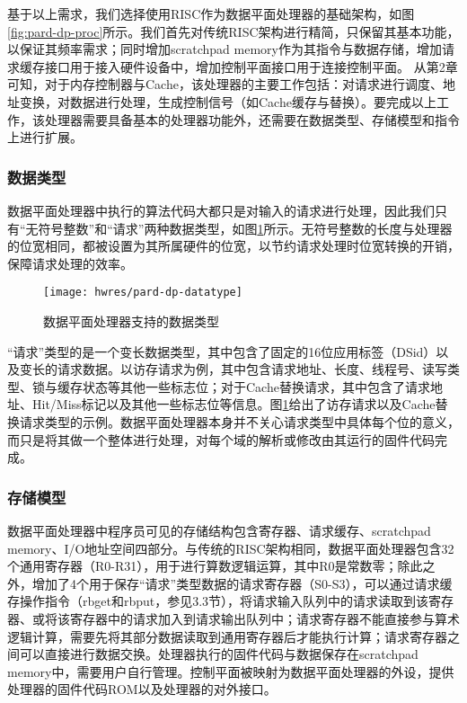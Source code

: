 基于以上需求，我们选择使用RISC作为数据平面处理器的基础架构，如图\ref{fig:pard-dp-proc}所示。我们首先对传统RISC架构进行精简，只保留其基本功能，以保证其频率需求；同时增加scratchpad memory作为其指令与数据存储，增加请求缓存接口用于接入硬件设备中，增加控制平面接口用于连接控制平面。
从第2章可知，对于内存控制器与Cache，该处理器的主要工作包括：对请求进行调度、地址变换，对数据进行处理，生成控制信号（如Cache缓存与替换）。要完成以上工作，该处理器需要具备基本的处理器功能外，还需要在数据类型、存储模型和指令上进行扩展。


\subsubsection{数据类型}

数据平面处理器中执行的算法代码大都只是对输入的请求进行处理，因此我们只有``无符号整数''和``请求''两种数据类型，如图\ref{fig:pard-dp-datatype}所示。无符号整数的长度与处理器的位宽相同，都被设置为其所属硬件的位宽，以节约请求处理时位宽转换的开销，保障请求处理的效率。

\begin{figure}[H]
  \centering
  \texttt{[image: hwres/pard-dp-datatype]}
  \caption{数据平面处理器支持的数据类型}
  \label{fig:pard-dp-datatype}
\end{figure}
 
``请求''类型的是一个变长数据类型，其中包含了固定的16位应用标签（DSid）以及变长的请求数据。以访存请求为例，其中包含请求地址、长度、线程号、读写类型、锁与缓存状态等其他一些标志位；对于Cache替换请求，其中包含了请求地址、Hit/Miss标记以及其他一些标志位等信息。图\ref{fig:pard-dp-datatype}给出了访存请求以及Cache替换请求类型的示例。数据平面处理器本身并不关心请求类型中具体每个位的意义，而只是将其做一个整体进行处理，对每个域的解析或修改由其运行的固件代码完成。

\subsubsection{存储模型}
数据平面处理器中程序员可见的存储结构包含寄存器、请求缓存、scratchpad memory、I/O地址空间四部分。与传统的RISC架构相同，数据平面处理器包含32个通用寄存器（R0-R31），用于进行算数逻辑运算，其中R0是常数零；除此之外，增加了4个用于保存``请求''类型数据的请求寄存器（S0-S3），可以通过请求缓存操作指令（rbget和rbput，参见3.3节），将请求输入队列中的请求读取到该寄存器、或将该寄存器中的请求加入到请求输出队列中；请求寄存器不能直接参与算术逻辑计算，需要先将其部分数据读取到通用寄存器后才能执行计算；请求寄存器之间可以直接进行数据交换。处理器执行的固件代码与数据保存在scratchpad memory中，需要用户自行管理。控制平面被映射为数据平面处理器的外设，提供处理器的固件代码ROM以及处理器的对外接口。

